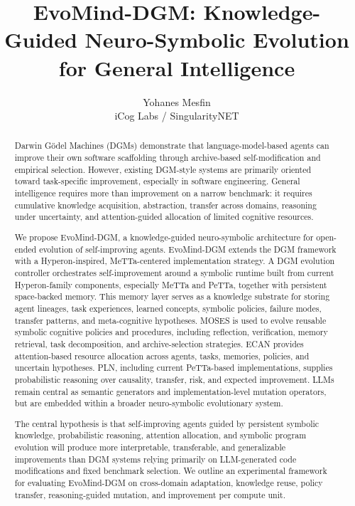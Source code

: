 \documentclass[11pt]{article}
\title{
EvoMind-DGM: Knowledge-Guided Neuro-Symbolic Evolution\\
for General Intelligence
}
\author{
Yohanes Mesfin \\
iCog Labs / SingularityNET  \\
\text{yohanesmesfin3@gmail.com}
}
\date{}
\begin{document}
\maketitle

\begin{abstract}
Darwin G\"odel Machines (DGMs) demonstrate that language-model-based agents can improve their own software scaffolding through archive-based self-modification and empirical selection. However, existing DGM-style systems are primarily oriented toward task-specific improvement, especially in software engineering. General intelligence requires more than improvement on a narrow benchmark: it requires cumulative knowledge acquisition, abstraction, transfer across domains, reasoning under uncertainty, and attention-guided allocation of limited cognitive resources.

We propose EvoMind-DGM, a knowledge-guided neuro-symbolic architecture for open-ended evolution of self-improving agents. EvoMind-DGM extends the DGM framework with a Hyperon-inspired, MeTTa-centered implementation strategy. A DGM evolution controller orchestrates self-improvement around a symbolic runtime built from current Hyperon-family components, especially MeTTa and PeTTa, together with persistent space-backed memory. This memory layer serves as a knowledge substrate for storing agent lineages, task experiences, learned concepts, symbolic policies, failure modes, transfer patterns, and meta-cognitive hypotheses. MOSES is used to evolve reusable symbolic cognitive policies and procedures, including reflection, verification, memory retrieval, task decomposition, and archive-selection strategies. ECAN provides attention-based resource allocation across agents, tasks, memories, policies, and uncertain hypotheses. PLN, including current PeTTa-based implementations, supplies probabilistic reasoning over causality, transfer, risk, and expected improvement. LLMs remain central as semantic generators and implementation-level mutation operators, but are embedded within a broader neuro-symbolic evolutionary system.

The central hypothesis is that self-improving agents guided by persistent symbolic knowledge, probabilistic reasoning, attention allocation, and symbolic program evolution will produce more interpretable, transferable, and generalizable improvements than DGM systems relying primarily on LLM-generated code modifications and fixed benchmark selection. We outline an experimental framework for evaluating EvoMind-DGM on cross-domain adaptation, knowledge reuse, policy transfer, reasoning-guided mutation, and improvement per compute unit.
\end{abstract}
\end{document}
